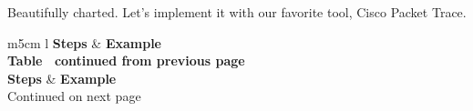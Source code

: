 \documentclass[11pt,a4paper]{report}
\begin{document}
    Beautifully charted. Let's implement it with our favorite tool, Cisco Packet Trace.\\
    \begin{flushleft}
            \begin{center}
                \begin{longtable}{ m{5cm} l }
                    \textbf{Steps} & \textbf{Example} \\
                    \hline
                    \endfirsthead
                    {{\bfseries Table \thetable\ continued from previous page}} \\
                    \textbf{Steps} & \textbf{Example} \\
                    \hline
                    \endhead
                    \hline Continued on next page \\
                    \endfoot
                    \endlastfoot


\end{longtable}
\end{center}
\end{flushleft}
\end{document}
